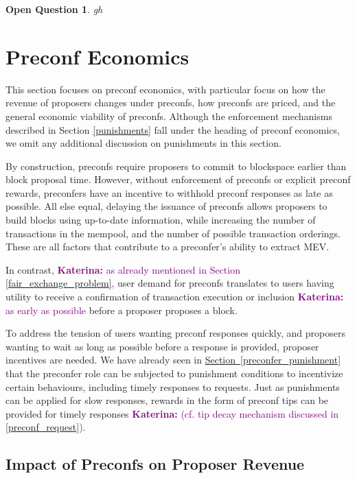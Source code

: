 \documentclass[a4paper]{article}
\theoremstyle{boldstyle}
\newtheorem{openquestionx}{Open Question}
\newenvironment{openquestion}
  {\begin{openboxq}\begin{openquestionx}}
  {\end{openquestionx}\end{openboxq}}
\newcommand{\ks}[1]{\textcolor{purple}{\textbf{Katerina:} #1}}
\begin{document}
\begin{openquestion} 
    {gh}
\end{openquestion}


\section{Preconf Economics}
\label{preconf_economics}

This section focuses on preconf economics, with particular focus on how the revenue of proposers changes under preconfs, how preconfs are priced, and the general economic viability of preconfs. Although the enforcement mechanisms described in Section \ref{punishments} fall under the heading of preconf economics, we omit any additional discussion on punishments in this section.

By construction, preconfs require proposers to commit to blockspace earlier than block proposal time. However, without enforcement of preconfs or explicit preconf rewards, preconfers have an incentive to withhold preconf responses as late as possible. All else equal, delaying the issuance of preconfs allows proposers to build blocks using up-to-date information, while increasing the number of transactions in the mempool, and the number of possible transaction orderings. These are all factors that contribute to a preconfer's ability to extract MEV. 

In contrast, \ks{as already mentioned in Section \ref{fair_exchange_problem},} user demand for preconfs translates to users having utility to receive a confirmation of transaction execution or inclusion \ks{as early as possible} before a proposer proposes a block. 

To address the tension of users wanting preconf responses quickly, and proposers wanting to wait as long as possible before a response is provided, proposer incentives are needed. We have already seen in \hyperref[preconfer_punishment]{Section~\ref{preconfer_punishment}} that the preconfer role can be subjected to punishment conditions to incentivize certain behaviours, including timely responses to requests. Just as punishments can be applied for slow responses, rewards in the form of preconf tips can be provided for timely responses \ks{(cf. tip decay mechanism discussed in \ref{preconf_request})}. 


\subsection{Impact of Preconfs on Proposer Revenue}
    
\end{document}
